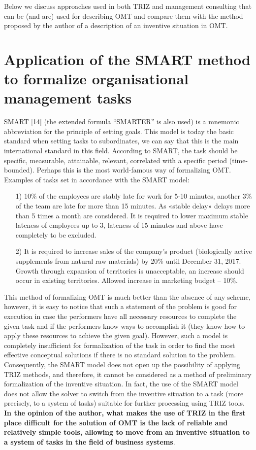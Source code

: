 \documentclass[11pt,a4paper]{book}
\begin{document}
Below we discuss approaches used in both TRIZ and management consulting that
can be (and are) used for describing OMT and compare them with the method
proposed by the author of a description of an inventive situation in OMT.

\section[The SMART method]{Application of the SMART method to formalize
  organisational management tasks}

SMART [14] (the extended formula “SMARTER” is also used) is a mnemonic
abbreviation for the principle of setting goals. This model is today the basic
standard when setting tasks to subordinates, we can say that this is the main
international standard in this field. According to SMART, the task should be
specific, measurable, attainable, relevant, correlated with a specific period
(time-bounded). Perhaps this is the most world-famous way of formalizing OMT.
Examples of tasks set in accordance with the SMART model:
\begin{itemize}\it
\item [1)] 10\% of the employees are stably late for work for 5-10 minutes,
  another 3\% of the team are late for more than 15 minutes. As «stable delay»
  delays more than 5 times a month are considered. It is required to lower
  maximum stable lateness of employees up to 3, lateness of 15 minutes and
  above have completely to be excluded.
\item[2)] It is required to increase sales of the company's product
  (biologically active supplements from natural raw materials) by 20\% until
  December 31, 2017. Growth through expansion of territories is unacceptable,
  an increase should occur in existing territories.  Allowed increase in
  marketing budget -- 10\%.
\end{itemize}

This method of formalizing OMT is much better than the absence of any scheme,
however, it is easy to notice that such a statement of the problem is good for
execution in case the performers have all necessary resources to complete the
given task and if the performers know ways to accomplish it (they know how to
apply these resources to achieve the given goal). However, such a model is
completely insufficient for formalization of the task in order to find the
most effective conceptual solutions if there is no standard solution to the
problem. Consequently, the SMART model does not open up the possibility of
applying TRIZ methods, and therefore, it cannot be considered as a method of
preliminary formalization of the inventive situation.  In fact, the use of the
SMART model does not allow the solver to switch from the inventive situation
to a task (more precisely, to a system of tasks) suitable for further
processing using TRIZ tools. \textbf{In the opinion of the author, what makes
  the use of TRIZ in the first place difficult for the solution of OMT is the
  lack of reliable and relatively simple tools, allowing to move from an
  inventive situation to a system of tasks in the field of business systems}.
\end{document}
